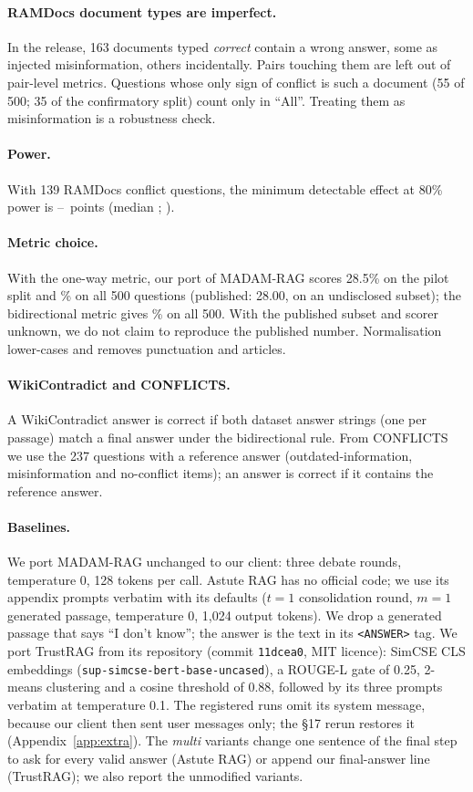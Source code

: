 \paragraph{RAMDocs document types are imperfect.} In the release, 163 documents typed \emph{correct} contain a
wrong answer, some as injected misinformation, others incidentally. Pairs touching them are left out of pair-level
metrics. Questions whose only sign of conflict is such a document (55 of 500; 35 of the confirmatory split) count
only in ``All''. Treating them as misinformation is a robustness check.

\paragraph{Power.} With 139 RAMDocs conflict questions, the minimum detectable effect at 80\% power is
\mdeLo--\mdeHi\ points (median \mdeMed; \citealp{card2020power}).

\paragraph{Metric choice.} With the one-way metric, our port of MADAM-RAG scores 28.5\% on the pilot split and
\madamOneWay\% on all 500 questions (published: 28.00, on an undisclosed subset); the bidirectional metric gives
\madamBidir\% on all 500. With the published subset and scorer unknown, we do not claim to reproduce the
published number. Normalisation lower-cases and removes punctuation and articles.

\paragraph{WikiContradict and CONFLICTS.} A WikiContradict answer is correct if both dataset answer strings
(one per passage) match a final answer under the bidirectional rule. From CONFLICTS we use the 237 questions with
a reference answer (outdated-information, misinformation and no-conflict items); an answer is correct if it
contains the reference answer.

\paragraph{Baselines.} We port MADAM-RAG unchanged to our client: three debate rounds, temperature 0, 128 tokens
per call. Astute RAG has no official code; we use its appendix prompts verbatim with its defaults
($t{=}1$ consolidation round, $m{=}1$ generated passage, temperature 0, 1,024 output tokens). We drop a generated
passage that says ``I don't know''; the answer is the text in its \texttt{<ANSWER>} tag. We port
TrustRAG from its repository (commit \texttt{11dcea0}, MIT licence): SimCSE CLS embeddings
(\texttt{sup-simcse-bert-base-uncased}), a ROUGE-L gate of 0.25, 2-means clustering and a cosine threshold of 0.88,
followed by its three prompts verbatim at temperature 0.1. The registered runs omit its system message, because our client then sent
user messages only; the \S17 rerun restores it (Appendix~\ref{app:extra}). The \emph{multi} variants change one sentence of the final step to ask for every valid answer
(Astute RAG) or append our final-answer line (TrustRAG); we also report the unmodified variants.


